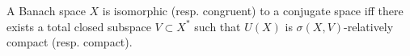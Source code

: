A Banach space $X$ is isomorphic (resp. congruent) to a conjugate space iff there exists a total closed subspace $V \subset X^*$ such that $U(X)$ is $\sigma(X, V)$-relatively compact (resp. compact).